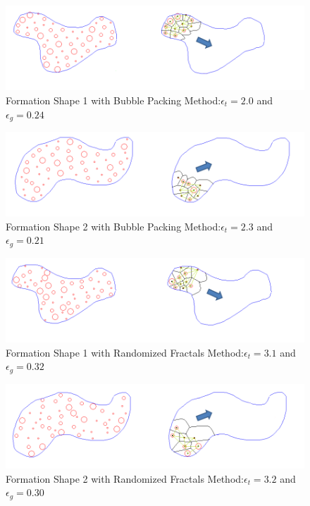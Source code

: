 \documentclass[twoside]{article}
\begin{document}
				\begin{figure}[H]
					\caption{Formation Shape 1 with Bubble Packing Method:$\epsilon_t = 2.0$ and $\epsilon_g = 0.24$}
					\centerline{\includegraphics[scale = 0.70]{Bubble_Packing_Mesh_1}}
				\end{figure} 	
						\begin{figure}[H]
							\caption{Formation Shape 2 with Bubble Packing Method:$\epsilon_t = 2.3$ and $\epsilon_g = 0.21$}
							\centerline{\includegraphics[scale = 0.65]{Bubble_Packing_Mesh_2}}
						\end{figure} 			
						\begin{figure}[H]
							\caption{Formation Shape 1 with Randomized Fractals Method:$\epsilon_t = 3.1$ and $\epsilon_g = 0.32$}
							\centerline{\includegraphics[scale = 0.70]{Randomized_Fractals_Mesh_1}}
						\end{figure} 	
						\begin{figure}[H]
							\caption{Formation Shape 2 with Randomized Fractals Method:$\epsilon_t = 3.2$ and $\epsilon_g = 0.30$}
							\centerline{\includegraphics[scale = 0.65]{Randomized_Fractals_Mesh_2}}
						\end{figure} 	
\end{document}
